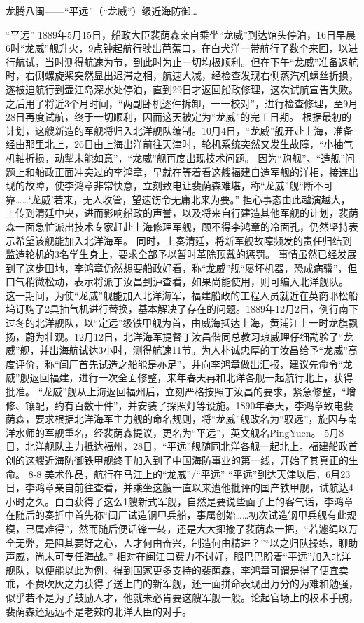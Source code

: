 \documentclass[12pt,UTF8]{ctexbook}
\begin{document}
龙腾八闽——“平远”（“龙威”）级近海防御…

“平远”
1889年5月15日，船政大臣裴荫森亲自乘坐“龙威”到达馆头停泊，16日早晨6时“龙威”舰升火，9点钟起航行驶出芭蕉口，在白犬洋一带航行了数个来回，以进行航试，当时测得航速为节，到此时为止一切均极顺利。但在下午“龙威”准备返航时，右侧螺旋桨突然显出迟滞之相，航速大减，经检查发现右侧蒸汽机螺丝折损，遂被迫航行到壶江岛深水处停泊，直到29日才返回船政修理，这次试航宣告失败。之后用了将近3个月时间，“两副卧机逐件拆卸，一一校对”，进行检查修理，至9月28日再度试航，终于一切顺利，因而这天被定为“龙威”的完工日期。
根据最初的计划，这艘新造的军舰将归入北洋舰队编制。10月4日，“龙威”舰开赴上海，准备经由那里北上，26日由上海出洋前往天津时，轮机系统突然又发生故障，“小抽气机轴折损，动掣未能如意”，“龙威”舰再度出现技术问题。 因为“购舰”、“造舰”问题上和船政正面冲突过的李鸿章，早就在等着看这艘福建自造军舰的洋相，接连出现的故障，使李鸿章非常快意，立刻致电让裴荫森难堪，称“龙威”舰“断不可靠……‘龙威’若来，无人收管，望速饬令无庸北来为要。”
担心事态由此越演越大，上传到清廷中央，进而影响船政的声誉，以及将来自行建造其他军舰的计划，裴荫森一面急忙派出技术专家赶赴上海修理军舰，顾不得李鸿章的冷面孔，仍然坚持表示希望该舰能加入北洋海军。 同时，上奏清廷，将新军舰故障频发的责任归结到监造轮机的3名学生身上，要求全部予以暂时革除顶戴的惩罚。 事情虽然已经发展到了这步田地，李鸿章仍然想要船政好看，称“龙威”舰“屡坏机器，恐成病骥”，但口气稍微松动，表示将派丁汝昌到沪查看，如果尚能使用，则可编入北洋舰队。
这一期间，为使“龙威”舰能加入北洋海军，福建船政的工程人员就近在英商耶松船坞订购了2具抽气机进行替换，基本解决了存在的问题。1889年12月2日，例行南下过冬的北洋舰队，以“定远”级铁甲舰为首，由威海抵达上海，黄浦江上一时龙旗飘扬，蔚为壮观。12月12日，北洋海军提督丁汝昌偕同总教习琅威理仔细勘验了“龙威”舰，并出海航试达3小时，测得航速11节。为人朴诚忠厚的丁汝昌给予“龙威”高度评价，称“闽厂首先试造之船能是亦足”，并向李鸿章做出汇报，建议先命令“龙威”舰返回福建，进行一次全面修整，来年春天再和北洋各舰一起航行北上，获得批准。
“龙威”舰从上海返回福州后，立刻严格按照丁汝昌的要求，紧急修整，“增修、镶配，约有百数十件”，并安装了探照灯等设施。1890年春天，李鸿章致电裴荫森，要求根据北洋海军主力舰的命名规则，将“龙威”舰改名为“驭远”，旋因与南洋水师的军舰重名，经裴荫森提议，更名为“平远”，英文舰名PingYuen。 5月8日，北洋舰队主力抵达福州，28日，“平远”舰随同北洋各舰一起北上。福建船政首创的这艘近海防御铁甲舰终于加入到了中国海防事业的第一线，开始了其真正的生命。
8-8 美术作品，航行在马江上的“龙威”/“平远”
“平远”到达天津以后，6月23日，李鸿章亲自前往查看，并乘坐这艘一直以来遭他批评的国产铁甲舰，试航达4小时之久。白白获得了这么1艘新式军舰，自然是要说些面子上的客气话，李鸿章在随后的奏折中首先称“闽厂试造钢甲兵船，事属创始……初次试造钢甲兵舰有此规模，已属难得”，然而随后便话锋一转，还是大大揶揄了裴荫森一把，“若遽绳以万全无弊，是阻其要好之心，人才何由奋兴，制造何由精进？”“以之归队操练，聊助声威，尚未可专任海战。” 相对在闽江口费力不讨好，眼巴巴盼着“平远”加入北洋舰队，以便能以此为例，得到国家更多支持的裴荫森，李鸿章可谓是得了便宜卖乖，不费吹灰之力获得了送上门的新军舰，还一面拼命表现出万分的为难和勉强，似乎若不是为了鼓励人才，他就未必肯要这艘军舰一般。论起官场上的权术手腕，裴荫森还远远不是老辣的北洋大臣的对手。
\end{document}
